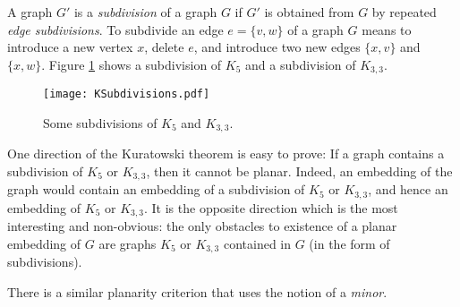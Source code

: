 

\setcounter{section}{3}
\setcounter{subsection}{3}
\setcounter{dfn}{10}


A graph $G'$ is a \emph{subdivision} of a graph $G$ if $G'$ is obtained from $G$ by repeated \emph{edge subdivisions}.
To subdivide an edge $e = \{v,w\}$ of a graph $G$ means to introduce a new vertex $x$, delete $e$, and introduce two new edges $\{x,v\}$ and $\{x,w\}$.
Figure \ref{fig:KSubdivisions} shows a subdivision of $K_5$ and a subdivision of $K_{3,3}$.

\begin{figure}[ht]
\begin{center}
\texttt{[image: KSubdivisions.pdf]}
\end{center}
\caption{Some subdivisions of $K_5$ and $K_{3,3}$.}
\label{fig:KSubdivisions}
\end{figure}

One direction of the Kuratowski theorem is easy to prove: If a graph contains a subdivision of $K_5$ or $K_{3,3}$, then it cannot be planar.
Indeed, an embedding of the graph would contain an embedding of a subdivision of $K_5$ or $K_{3,3}$,
and hence an embedding of $K_5$ or $K_{3,3}$.
It is the opposite direction which is the most interesting and non-obvious:
the only obstacles to existence of a planar embedding of $G$ are graphs $K_5$ or $K_{3,3}$ contained in $G$ (in the form of subdivisions).


There is a similar planarity criterion that uses the notion of a \emph{minor}.


